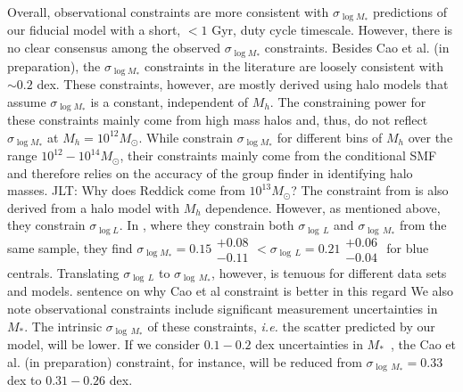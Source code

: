 \documentclass[12pt, letterpaper, preprint, tighten]{aastex62}
\newcommand{\ch}[1]{{\color{orange}{\bf CH:} #1}}
\newcommand{\edt}[1]{{\color{dred}{\bf} #1}}
\newcommand{\cao}{Cao et al. (in preparation)}
\newcommand{\siglogm}{\sigma_{\log M_*}}
\begin{document}
\edt{Overall, observational constraints are more consistent with $\siglogm$ 
predictions of our fiducial model with a short, $< 1$ Gyr, duty cycle timescale. 
However, there is no clear consensus among the observed $\siglogm$ constraints. 
Besides \cao, the $\siglogm$ constraints in the literature are loosely 
consistent with $\sim 0.2$ dex. These constraints, however, are mostly derived 
using halo models that assume $\siglogm$ is a constant, independent of $M_h$. 
The constraining power for these constraints mainly come from high mass halos 
and, thus, do not reflect $\siglogm$ at $M_h=10^{12}M_\odot$}.
While \cite{reddick2013} constrain $\siglogm$ for different bins of
$M_h$ over the range $10^{12} - 10^{14} M_\odot$, %
their constraints mainly come from the conditional SMF and therefore relies on
the accuracy of the \cite{tinker2011} group finder in identifying halo masses.
\ch{JLT: Why does Reddick come from $10^{13} M_\odot$?} %
The constraint from \cite{lange2018a} is also derived from a halo model
with $M_h$ dependence. However, as mentioned above, they constrain $\sigma_{\log L}$.
In \cite{more2011}, where they constrain both $\sigma_{\log\,L}$ and $\sigma_{\log\,M_*}$
from the same sample, they find
$\siglogm = 0.15\substack{+0.08\\ -0.11} < \sigma_{\log\,L} = 0.21\substack{+0.06\\ -0.04}$
for blue centrals. Translating $\sigma_{\log\,L}$ to $\sigma_{\log\,M_*}$, however, 
is tenuous for different data sets and models. %
\ch{sentence on why Cao et al constraint is better in this regard} 
\edt{We also note observational constraints include significant measurement
uncertainties in $M_*$. The intrinsic $\sigma_{\log\,M_*}$ of these constraints,
\emph{i.e.} the scatter predicted by our model, will be lower. If we consider
$0.1 - 0.2$ dex uncertainties in $M_*$~\citep{roediger2015}, the
Cao et al. (in preparation) constraint, for instance, will be reduced from
$\sigma_{\log\,M_*} = 0.33$ dex to $0.31 - 0.26$ dex. }
\end{document}
